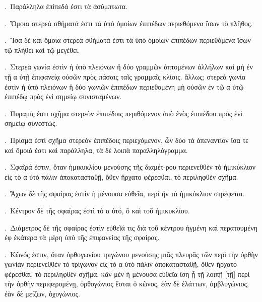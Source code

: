 \begin{Parallel}{}{}
{.~{\greekfont Παράλληλα ἐπίπεδά ἐστι τὰ ἀσύμπτωτα.}


\ParallelPar
{}.~{\greekfont Ὅμοια στερεὰ σθήματά ἐστι τὰ ὑπὸ ὁμοίων
ἐπιπέδων περιεθόμενα ἴσων τὸ πλῆθος.}

\ParallelPar

.~{\greekfont Ἴσα δὲ καὶ ὅμοια στερεὰ σθήματά ἐστι τὰ ὑπὸ
ὁμοίων ἐπιπέδων περιεθόμενα ἴσων τῷ πλήθει καὶ τῷ
μεγέθει.}

\ParallelPar

.~{\greekfont Στερεὰ γωνία ἐστὶν ἡ ὑπὸ πλειόνων ἢ δύο γραμμῶν
ἁπτομένων ἀλλήλων καὶ μὴ ἐν τῇ α ὐτῇ ἐπιφανείᾳ
οὐσῶν πρὸς πάσαις ταῖς γραμμαῖς κλίσις. ἄλλως; στερεὰ γωνία
ἐστὶν ἡ ὑπὸ πλειόνων  ἢ δύο γωνιῶν ἐπιπέδων
περιεθομένη μὴ οὐσῶν ἐν τῷ α ὐτῷ ἐπιπέδῳ
πρὸς ἑνὶ σημείῳ συνισταμένων.}

\ParallelPar

.~{\greekfont Πυραμίς ἐστι σχῆμα στερεὸν ἐπιπέδοις περιθόμενον
ἀπὸ ἑνὸς ἐπιπέδου πρὸς ἑνὶ σημείῳ συνεστώς.}

\ParallelPar

.~{\greekfont Πρίσμα ἐστὶ σχῆμα στερεὸν ἐπιπέδοις περιεχόμενον,
ὧν δύο τὰ ἀπεναντίον ἴσα τε καὶ ὅμοιά ἐστι καὶ
παράλληλα, τὰ δὲ λοιπὰ παραλληλόγραμμα.}

\ParallelPar

.~{\greekfont Σφαῖρά ἐστιν, ὅταν ἡμικυκλίου μενούσης τῆς διαμέτ-ρου
περιενεθθὲν τὸ ἡμικύκλιον  εἰς τὸ α ὐτὸ πάλιν ἀποκατασταθῇ,
 ὅθεν ἤρχατο φέρεσθαι, τὸ περιληφθὲν σχῆμα.}

\ParallelPar
 
.~{\greekfont Ἄχων δὲ τῆς σφαίρας ἐστὶν ἡ μένουσα εὐθεῖα, περὶ
ἣν τὸ ἡμικύκλιον στρέφεται.}

\ParallelPar

.~{\greekfont Κέντρον δὲ τῆς σφαίρας ἐστὶ τὸ α ὐτό, ὃ καὶ τοῦ
ἡμικυκλίου.}

\ParallelPar

.~{\greekfont Διάμετρος δὲ τῆς σφαίρας ἐστὶν εὐθεῖά τις διὰ τοῦ
κέντρου ἠγμένη καὶ περατουμένη ἐφ ἑκάτερα τὰ
μέρη ὑπὸ τῆς ἐπιφανείας τῆς σφαίρας.}

\ParallelPar

.~{\greekfont Κῶνός ἐστιν, ὅταν ὀρθογωνίου τριγώνου μενούσης μιᾶς
πλευρᾶς τῶν περὶ τὴν ὀρθὴν γωνίαν περιενεθθὲν τὸ τρίγωνον εἰς τὸ 
α ὐτὸ πάλιν ἀποκατασταθῇ, ὅθεν ἤρχατο φέρεσθαι, τὸ περιληφθὲν σχῆμα. κἂν μὲν ἡ μένουσα εὐθεῖα ἴση ᾖ τῇ λοιπῇ [τῇ] περὶ
τὴν ὀρθὴν περιφερομένῃ, ὀρθογώνιος ἔσται ὁ κῶνος, ἐὰν δὲ ἐλάττων, ἀμβλυγώνιος, ἐὰν δὲ μείζων, ὀχυγώνιος.}

}
\end{Parallel}
